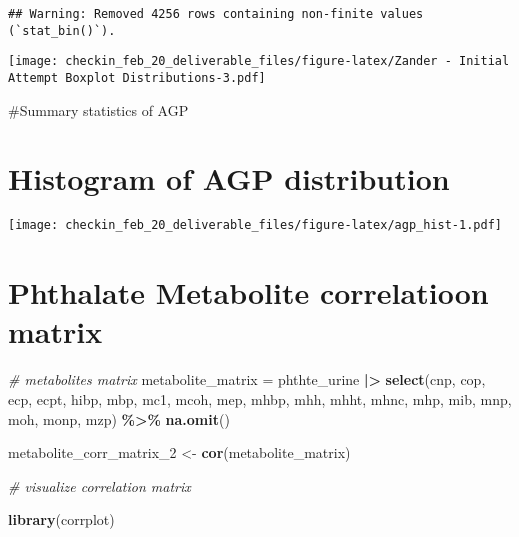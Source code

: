 \documentclass[
]{article}
\newenvironment{Shaded}{\begin{snugshade}}{\end{snugshade}}
\newcommand{\AttributeTok}[1]{\textcolor[rgb]{0.13,0.29,0.53}{#1}}
\newcommand{\CommentTok}[1]{\textcolor[rgb]{0.56,0.35,0.01}{\textit{#1}}}
\newcommand{\FunctionTok}[1]{\textcolor[rgb]{0.13,0.29,0.53}{\textbf{#1}}}
\newcommand{\NormalTok}[1]{#1}
\newcommand{\OtherTok}[1]{\textcolor[rgb]{0.56,0.35,0.01}{#1}}
\newcommand{\SpecialCharTok}[1]{\textcolor[rgb]{0.81,0.36,0.00}{\textbf{#1}}}
\newcommand{\StringTok}[1]{\textcolor[rgb]{0.31,0.60,0.02}{#1}}
\begin{document}
\begin{verbatim}
## Warning: Removed 4256 rows containing non-finite values (`stat_bin()`).
\end{verbatim}

\texttt{[image: checkin\_feb\_20\_deliverable\_files/figure-latex/Zander - Initial Attempt Boxplot Distributions-3.pdf]}

\#Summary statistics of AGP

\hypertarget{histogram-of-agp-distribution}{%
\section{Histogram of AGP
distribution}\label{histogram-of-agp-distribution}}

\begin{Shaded}
\end{Shaded}

\texttt{[image: checkin\_feb\_20\_deliverable\_files/figure-latex/agp\_hist-1.pdf]}

\hypertarget{phthalate-metabolite-correlatioon-matrix}{%
\section{Phthalate Metabolite correlatioon
matrix}\label{phthalate-metabolite-correlatioon-matrix}}

\begin{Shaded}
\begin{Highlighting}[]
\CommentTok{\# metabolites matrix }
\NormalTok{metabolite\_matrix }\OtherTok{=}\NormalTok{ phthte\_urine }\SpecialCharTok{|\textgreater{}} 
  \FunctionTok{select}\NormalTok{(cnp, cop, ecp, ecpt, hibp, mbp, mc1, mcoh, mep, mhbp, mhh, mhht, mhnc, mhp, mib, mnp, moh, monp, mzp) }\SpecialCharTok{\%\textgreater{}\%} 
  \FunctionTok{na.omit}\NormalTok{()}

\NormalTok{metabolite\_corr\_matrix\_2 }\OtherTok{\textless{}{-}} \FunctionTok{cor}\NormalTok{(metabolite\_matrix)}

\CommentTok{\# visualize correlation matrix}

\FunctionTok{library}\NormalTok{(corrplot)}
\end{Highlighting}
\end{Shaded}
\end{document}
